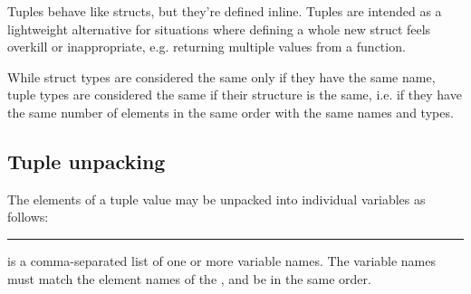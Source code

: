 Tuples behave like structs, but they're defined inline. Tuples are intended as
a lightweight alternative for situations where defining a whole new struct feels
overkill or inappropriate, e.g. returning multiple values from a function.

While struct types are considered the same only if they have the same name,
tuple types are considered the same if their structure is the same, i.e. if they
have the same number of elements in the same order with the same names and
types.

\subsection{Tuple unpacking}

The elements of a tuple value may be unpacked into individual variables as
follows:

\begin{grammar}
\rule{tuple-unpack-statement}  \code{=}  \code{;}
\end{grammar}

 is a comma-separated list of one or more variable
names. The variable names must match the element names of the
, and be in the same order.
